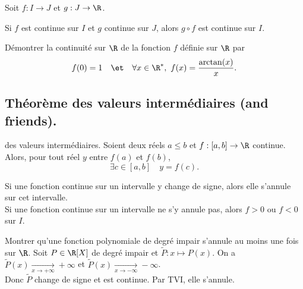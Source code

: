 \documentclass[11pt]{article}
\begin{document}
\vspace*{-0.4cm}

\begin{prop}{}{}
    Soit $f:I\to J$ et $g:J\to\R$.
    \begin{center}
        Si $f$ est continue sur $I$ et $g$ continue sur $J$, alors $g\circ f$ est continue sur $I$.
    \end{center}
\end{prop}

\vspace*{-0.4cm}

\begin{ex}{}{}
    Démontrer la continuité sur $\R$ de la fonction $f$ définie sur $\R$ par
    \begin{equation*}
        f(0)=1 \quad\et\quad \forall x \in \R^*, ~ f(x)=\frac{\arctan(x)}{x}.
    \end{equation*}
\end{ex}

\subsection{Théorème des valeurs intermédiaires (and friends).}

\begin{thm}{des valeurs intermédiaires.}{}
    Soient deux réels $a\leq b$ et $f:[a,b]\to\R$ continue. Alors, pour tout réel $y$ entre $f(a)$ et $f(b)$,
    \begin{equation*}
        \exists c \in [a,b] \quad y = f(c).
    \end{equation*}
\end{thm}

\vspace*{-0.4cm}

\begin{corr}{}{}
    Si une fonction continue sur un intervalle y change de signe, alors elle s'annule sur cet intervalle.\\
    Si une fonction continue sur un intervalle ne s'y annule pas, alors $f>0$ ou $f<0$ sur $I$.
\end{corr}

\vspace*{-0.4cm}

\begin{ex}{}{}
    Montrer qu'une fonction polynomiale de degré impair s'annule au moins une fois sur $\R$.
    \tcblower
    Soit $P\in\R[X]$ de degré impair et $\tilde{P}:x\mapsto P(x)$. On a $\tilde{P}(x)\xrightarrow[x\to+\infty]{}+\infty$ et $\tilde{P}(x)\xrightarrow[x\to-\infty]{}-\infty$.\\
    Donc $\tilde{P}$ change de signe et est continue. Par TVI, elle s'annule.
\end{ex}
\end{document}
